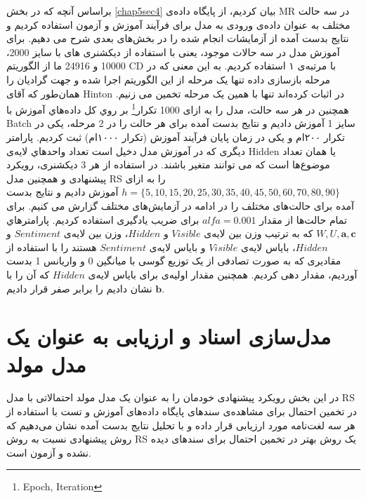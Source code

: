 براساس آنچه که در بخش
\ref{chap5sec4}
بيان کرديم، از پايگاه داده‌ی
MR
در سه حالت مختلف به عنوان داده‌ی ورودی به مدل برای فرآيند آموزش و آزمون استفاده کرديم و نتايج بدست آمده از آزمايشات انجام شده را در بخش‌های بعدی شرح می دهيم. برای آموزش مدل در سه حالات موجود، يعنی با استفاده از ديکشنری های با سايز 2000، 10000 و 24916 ما از الگوريتم 
CD
با مرتبه‌ی ۱ استفاده کرديم. به اين معنی که در مرحله بازسازی داده تنها يک مرحله از اين الگوريتم اجرا شده و جهت گراديان را همان‌طور که آقای 
Hinton
در 
\cite{hinton2002training}
اثبات کرده‌اند تنها با همين يک مرحله تخمين می زنيم. همچنين در هر سه حالت، مدل را به ازای 1000 تکرار\footnote{Epoch, Iteration}
 بر روي کل داده‌هاي آموزش با 
Batch
سايز 1 آموزش داديم و نتايج بدست آمده برای هر حالت را در 2 مرحله، يکی در تکرار ۲۰۰ام و يکی در زمان پايان فرآيند آموزش (تکرار ۱۰۰۰ام) ثبت کرديم. پارامتر ديگری که در آموزش مدل دخيل است تعداد واحدهاي لايه‌ی
Hidden
يا همان تعداد موضوع‌ها است که می توانند متغير باشند. در استفاده از هر 3 ديکشنری، رويکرد پيشنهادی و همچنین مدل 
RS
 را به ازای
$h=\{5,10,15,20,25,30,35,40,45,50,60,70,80,90 \}$
آموزش داديم و نتايج بدست آمده برای حالت‌های مختلف را در ادامه در آزمايش‌های مختلف گزارش می کنيم. برای تمام حالت‌ها از مقدار 
$alfa = 0.001$
برای ضريب يادگيری استفاده کرديم. پارامترهاي 
$W,U,\textbf{a},\textbf{c}$
که به ترتیب وزن بين لايه‌ی 
$Visible$
و
$Hidden$، 
وزن بين لايه‌ی
$Sentiment$
و 
$Hidden$،
باياس لايه‌ی 
$Visible$
و باياس لايه‌ی
$Sentiment$
هستند را با استفاده از مقاديری که به صورت تصادفی از يک توزیع گوسی با ميانگين 0 و واريانس 1 بدست آورديم، مقدار دهی کرديم. همچنين مقدار اوليه‌ی برای باياس لايه‌ی 
$Hidden$
که آن را با 
$\textbf{b}$
نشان داديم را برابر صفر قرار داديم.

\section{مدل‌سازی اسناد و ارزیابی به عنوان یک مدل مولد}
\label{chap5sec7}
در این بخش رویکرد پیشنهادی خودمان را به عنوان یک مدل مولد احتمالاتی با مدل 
RS
در تخمین احتمال برای مشاهده‌ی سندهای پایگاه داده‌های آموزش و تست با استفاده از هر سه لغت‌نامه مورد ارزیابی قرار داده و با تحلیل نتایج بدست آمده نشان می‌‌دهیم که روش پیشنهادی نسبت به روش 
RS
یک روش بهتر در تخمین احتمال برای سندهای دیده نشده و آزمون است. 

